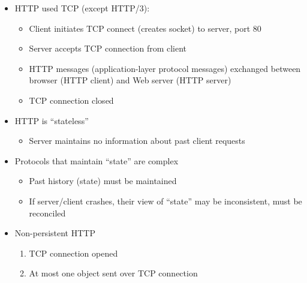 \begin{itemize}
\begin{itemize}
\begin{itemize}
        \end{itemize}

      \item HTTP used TCP (except HTTP/3):

        \begin{itemize}

          \item Client initiates TCP connect (creates socket) to server, port 80

          \item Server accepts TCP connection from client

          \item HTTP messages (application-layer protocol messages) exchanged between browser (HTTP client) and Web server (HTTP server)

          \item TCP connection closed

        \end{itemize}

      \item HTTP is ``stateless''

        \begin{itemize}

          \item Server maintains no information about past client requests

        \end{itemize}

      \item Protocols that maintain ``state'' are complex

        \begin{itemize}

          \item Past history (state) must be maintained

          \item If server/client crashes, their view of ``state'' may be inconsistent, must be reconciled

        \end{itemize}

      \item Non-persistent HTTP

        \begin{enumerate}

          \item TCP connection opened

          \item At most one object sent over TCP connection


\end{enumerate}
\end{itemize}
\end{itemize}
